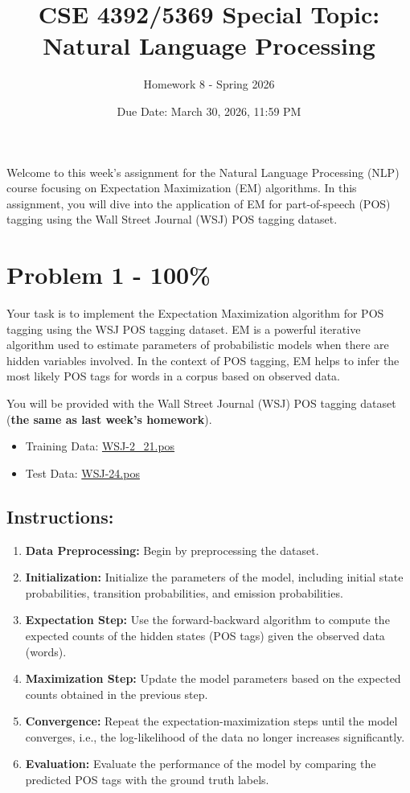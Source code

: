 \documentclass{article}
\begin{document}
\title{CSE 4392/5369 Special Topic: Natural Language Processing}
\author{Homework 8 - Spring 2026}
\date{Due Date: March 30, 2026, 11:59 PM}
\maketitle
\thispagestyle{fancy}


Welcome to this week's assignment for the Natural Language Processing (NLP) course focusing on Expectation Maximization (EM) algorithms. In this assignment, you will dive into the application of EM for part-of-speech (POS) tagging using the Wall Street Journal (WSJ) POS tagging dataset.
\section*{Problem 1 - 100\%}

Your task is to implement the Expectation Maximization algorithm for POS tagging using the WSJ POS tagging dataset. EM is a powerful iterative algorithm used to estimate parameters of probabilistic models when there are hidden variables involved. In the context of POS tagging, EM helps to infer the most likely POS tags for words in a corpus based on observed data.

You will be provided with the Wall Street Journal (WSJ) POS tagging dataset (\textbf{the same as last week's homework}).
\begin{itemize}
    \item Training Data: \href{https://drive.google.com/file/d/16H4D4nsntZVA4sXslWAy2nl8BX_gxofM/view?usp=sharing}{WSJ-2\_21.pos}
    \item Test Data: \href{https://drive.google.com/file/d/1yl_ea9VznZuauavGMLfLHxzcZf2yPil3/view?usp=sharing}{WSJ-24.pos}
\end{itemize}

\subsection*{Instructions:}
\begin{enumerate}
    \item \textbf{Data Preprocessing:} Begin by preprocessing the dataset.
    \item \textbf{Initialization:} Initialize the parameters of the model, including initial state probabilities, transition probabilities, and emission probabilities.
    \item \textbf{Expectation Step:} Use the forward-backward algorithm to compute the expected counts of the hidden states (POS tags) given the observed data (words).
    \item \textbf{Maximization Step:} Update the model parameters based on the expected counts obtained in the previous step.
    \item \textbf{Convergence:} Repeat the expectation-maximization steps until the model converges, i.e., the log-likelihood of the data no longer increases significantly.
    \item \textbf{Evaluation:} Evaluate the performance of the model by comparing the predicted POS tags with the ground truth labels.
\end{enumerate}
\end{document}
